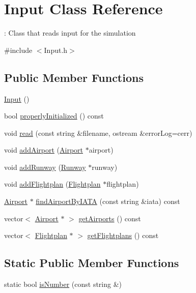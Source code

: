 \hypertarget{classInput}{}\section{Input Class Reference}
\label{classInput}


\+: Class that reads input for the simulation  




{\ttfamily \#include $<$Input.\+h$>$}

\subsection*{Public Member Functions}
\begin{DoxyCompactItemize}
\item 
\hyperlink{classInput_abae3f379d3f157cf42dc857309832dba}{Input} ()
\item 
bool \hyperlink{classInput_a42a0d1fd763cb2814cefe27b144ae0bb}{properly\+Initialized} () const 
\item 
void \hyperlink{classInput_abb78078475f91c654db63c392aefbf51}{read} (const string \&filename, ostream \&error\+Log=cerr)
\item 
void \hyperlink{classInput_adf2ec48d79d704c139f9a2ab295f8d21}{add\+Airport} (\hyperlink{classAirport}{Airport} $\ast$airport)
\item 
void \hyperlink{classInput_a047b280ecbd65bf8be570aba4f07f440}{add\+Runway} (\hyperlink{classRunway}{Runway} $\ast$runway)
\item 
void \hyperlink{classInput_af6a650235d15f760ec8764645ce19bc9}{add\+Flightplan} (\hyperlink{classFlightplan}{Flightplan} $\ast$flightplan)
\item 
\hyperlink{classAirport}{Airport} $\ast$ \hyperlink{classInput_a554acd227613a3b7ac86bce4d41060c7}{find\+Airport\+By\+I\+A\+TA} (const string \&iata) const 
\item 
vector$<$ \hyperlink{classAirport}{Airport} $\ast$ $>$ \hyperlink{classInput_aa1f634b15684092240be80cb17dd28ec}{get\+Airports} () const 
\item 
vector$<$ \hyperlink{classFlightplan}{Flightplan} $\ast$ $>$ \hyperlink{classInput_af03591fafa66902f7f4050b37e6b428e}{get\+Flightplans} () const 
\end{DoxyCompactItemize}
\subsection*{Static Public Member Functions}
\begin{DoxyCompactItemize}
\item 
static bool \hyperlink{classInput_a07fca98c3279dbcb8d49afa59bd9ad7f}{is\+Number} (const string \&)
\end{DoxyCompactItemize}


